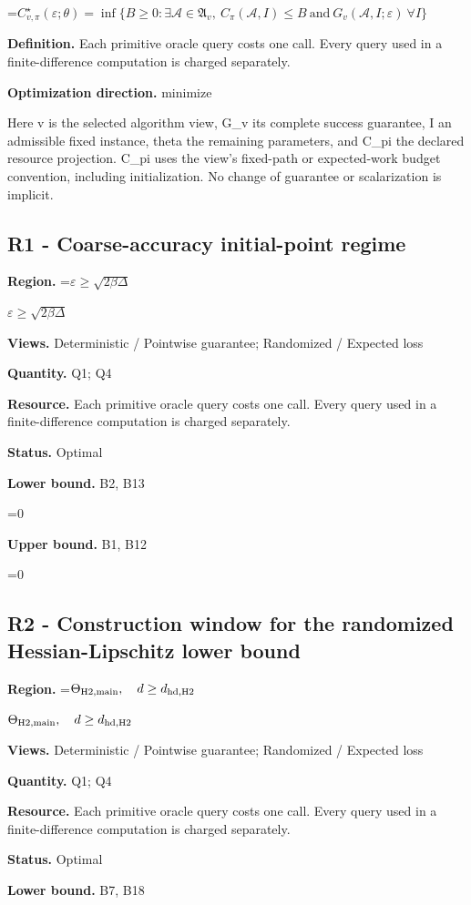 \documentclass[10pt,a4paper]{article}
\newcommand{\AtlasMath}[1]{\par\begingroup\centering\setbox0=\hbox{$\displaystyle #1$}\ifdim\wd0>1.4\linewidth\typeout{ATLAS WIDE FORMULA: \the\wd0}\fi\ifdim\wd0>\linewidth\resizebox{\linewidth}{!}{\box0}\else\box0\fi\par\endgroup}
\newcommand{\AtlasInlineMath}[1]{\begingroup\setbox0=\hbox{$#1$}\ifdim\wd0>.4\linewidth\endgroup\AtlasMath{#1}\else\endgroup$#1$\fi}
\begin{document}
\AtlasMath{C^\star_{v,\pi}(\varepsilon;\theta)=\inf\{B\ge0:\exists\mathcal A\in\mathfrak A_v,\ C_\pi(\mathcal A,I)\le B\ \text{and}\ G_v(\mathcal A,I;\varepsilon)\ \forall I\}}
\textbf{Definition.} Each primitive oracle query costs one call. Every query used in a finite-difference computation is charged separately.

\textbf{Optimization direction.} minimize

Here v is the selected algorithm view, G\_v its complete success guarantee, I an admissible fixed instance, theta the remaining parameters, and C\_pi the declared resource projection. C\_pi uses the view's fixed-path or expected-work budget convention, including initialization. No change of guarantee or scalarization is implicit.

\subsection{R1 - Coarse-accuracy initial-point regime}
\textbf{Region.} \AtlasInlineMath{\varepsilon\ge\sqrt{2\beta\Delta}}

\textbf{Views.} Deterministic / Pointwise guarantee; Randomized / Expected loss

\textbf{Quantity.} Q1; Q4

\textbf{Resource.} Each primitive oracle query costs one call. Every query used in a finite-difference computation is charged separately.

\textbf{Status.} Optimal

\textbf{Lower bound.} B2, B13

\AtlasMath{0}
\textbf{Upper bound.} B1, B12

\AtlasMath{0}
\subsection{R2 - Construction window for the randomized Hessian-Lipschitz lower bound}
\textbf{Region.} \AtlasInlineMath{\Theta_{\rm H2,main},\quad d\ge d_{\rm hd,H2}}

\textbf{Views.} Deterministic / Pointwise guarantee; Randomized / Expected loss

\textbf{Quantity.} Q1; Q4

\textbf{Resource.} Each primitive oracle query costs one call. Every query used in a finite-difference computation is charged separately.

\textbf{Status.} Optimal

\textbf{Lower bound.} B7, B18
\end{document}

